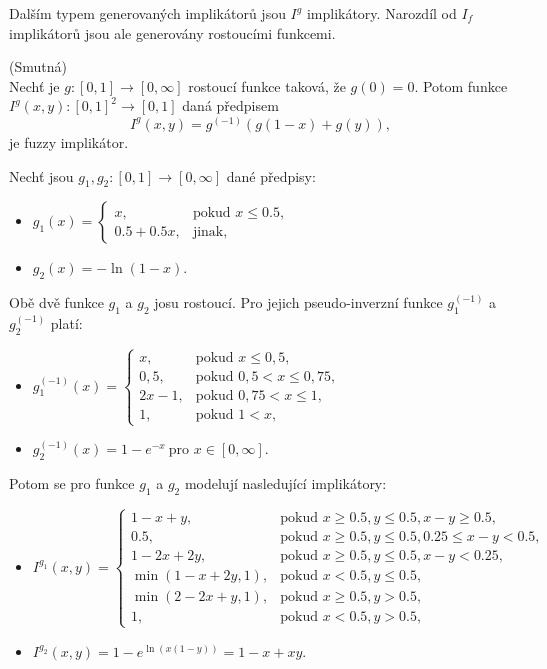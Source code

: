 Dalším typem generovaných implikátor\r u jsou $I^g$ implikátory. Narozdíl od $I_f$ implikátor\r u jsou ale generovány rostoucími funkcemi.

\begin{sentence}(Smutn\'a)\\
    Nech\v t je  $g:[0,1]\rightarrow [0,\infty]$ rostoucí funkce takov\'a, \v ze $g(0)=0$. 
    Potom funkce $I^g(x,y):[0,1]^2 \rightarrow [0,1]$ dan\'a předpisem
    \begin{equation}\label{g}
    I^g(x,y)=g^{(-1)}(g(1-x)+g(y)),
    \end{equation}
    je fuzzy implik\'ator.\\
\end{sentence}

\begin{example}
\cite{hlinena}
    Nech\v t jsou $g_1, g_2:[0,1] \rightarrow [0,\infty]$ 
    dan\'e předpisy:
    \begin{itemize}
    \item $g_1(x)=\begin{cases}  x,    &\mbox{pokud $x \leq 0.5$}, \\
    0.5+0.5x,      &\text{jinak,} \end{cases}$
    \item $g_2(x)=-\ln(1-x).$
    \end{itemize}
    Obě dvě funkce $g_1$ a $g_2$ josu rostoucí.
    Pro jejich pseudo-inverzn\'i funkce  $g_1^{(-1)}$ a $g_2^{(-1)}$ plat\'i:
    \begin{itemize}
    \item $g_1^{(-1)}(x)=\begin{cases} x, &\mbox{pokud $x \leq 0,5$}, \\
    0,5,   &\mbox{pokud $0,5 < x \leq 0,75$}, \\
    2x-1,   &\mbox{pokud $0,75 < x \leq 1$}, \\
    1,   &\mbox{pokud $1 < x$}, \end{cases}$
    \item $g_2^{(-1)}(x)=1-e^{-x} ~ \mbox{pro $x \in [0, \infty]$}.$
    \end{itemize}
    Potom se pro funkce $g_1$ a $g_2$ modelují nasleduj\'icí implik\'atory:
    \begin{itemize}
    \item $I^{g_1}(x,y)=\begin{cases}  1-x+y,      &\mbox{pokud $x \geq 0.5, y \leq 0.5, x-y \geq 0.5$}, \\
    0.5,      &\mbox{pokud $x \geq 0.5, y \leq 0.5, 0.25 \leq x-y < 0.5$}, \\
    1-2x+2y,      &\mbox{pokud $x \geq 0.5, y \leq 0.5, x-y < 0.25$}, \\
    \min(1-x+2y,1),       &\mbox{pokud $x < 0.5, y \leq 0.5$}, \\
    \min(2-2x+y,1),       &\mbox{pokud $x \geq 0.5, y>0.5$}, \\
    1,       &\mbox{pokud $x < 0.5, y > 0.5,$} \end{cases}$
    \item $I^{g_2}(x,y)=1-e^{\ln(x(1-y))}=1-x+xy.$
    \end{itemize}
\end{example}

